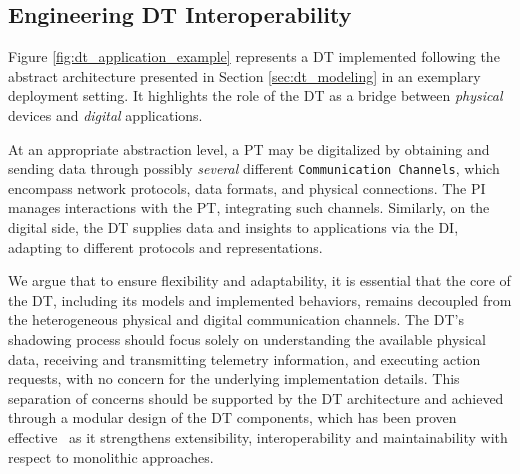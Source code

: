 

\subsection{Engineering \acl{DT} Interoperability}
\label{sec:engineering-interoperability}

Figure \ref{fig:dt_application_example} represents a \ac{DT} implemented following the abstract architecture presented in Section \ref{sec:dt_modeling} in an exemplary deployment setting.
It highlights the role of the \ac{DT} as a bridge between \emph{physical} devices and \emph{digital} applications.

At an appropriate abstraction level, a \ac{PT} may be digitalized by obtaining and sending data through possibly \emph{several} different \texttt{Communication Channels}, which 
encompass network protocols, data formats, and physical connections.
The \ac{PI} manages interactions with the \ac{PT}, integrating such channels.
%
Similarly, on the digital side, the \ac{DT} supplies data and insights to applications via the \ac{DI}, adapting to different protocols and representations.

%
We argue that to ensure flexibility and adaptability, it is essential that the core of the \ac{DT}, including its models and implemented behaviors, remains decoupled from the heterogeneous physical and digital communication channels.%
%
The \ac{DT}'s shadowing process should focus solely on understanding the available physical data, receiving and transmitting telemetry information, and executing action requests, with no concern for the underlying implementation details.
%
This separation of concerns should be supported by the \ac{DT} architecture and achieved through a modular design of the \ac{DT} components, which has been proven effective~\cite{requirements-patterns-dt-industry-bellavista-2023,bellavista2024fgcs} as it strengthens extensibility, interoperability and maintainability with respect to monolithic approaches.

